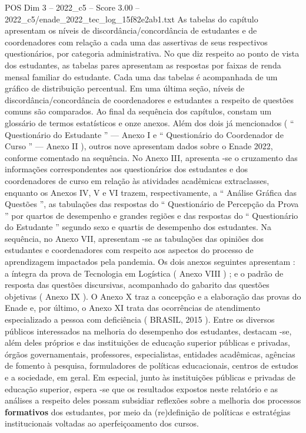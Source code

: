 \begin{textsample}{POS Dim 3 – 2022\_c5 – Score 3.00 – 2022\_c5/enade\_2022\_tec\_log\_15f82e2ab1.txt}
As tabelas do capítulo apresentam os níveis de discordância/concordância de estudantes e de coordenadores com relação a cada uma das assertivas de seus respectivos questionários, por categoria administrativa.
No que diz respeito ao ponto de vista dos estudantes, as tabelas pares apresentam as respostas por faixas de renda mensal familiar do estudante.
Cada uma das tabelas é acompanhada de um gráfico de distribuição percentual.
Em uma última seção, níveis de discordância/concordância de coordenadores e estudantes a respeito de questões comuns são comparados.
Ao final da sequência dos capítulos, constam um glossário de termos estatísticos e onze anexos.
Além dos dois já mencionados ( “ Questionário do Estudante ” — Anexo I e “ Questionário do Coordenador de Curso ” — Anexo II ), outros nove apresentam dados sobre o Enade 2022, conforme comentado na sequência.
No Anexo III, apresenta -se o cruzamento das informações correspondentes aos questionários dos estudantes e dos coordenadores de curso em relação às atividades acadêmicas extraclasses, enquanto os Anexos IV, V e VI trazem, respectivamente, a “ Análise Gráfica das Questões ”, as tabulações das respostas do “ Questionário de Percepção da Prova ” por quartos de desempenho e grandes regiões e das respostas do “ Questionário do Estudante ” segundo sexo e quartis de desempenho dos estudantes.
Na sequência, no Anexo VII, apresentam -se as tabulações das opiniões dos estudantes e coordenadores com respeito aos aspectos do processo de aprendizagem impactados pela pandemia.
Os dois anexos seguintes apresentam : a íntegra da prova de Tecnologia em Logística ( Anexo VIII ) ; e o padrão de resposta das questões discursivas, acompanhado do gabarito das questões objetivas ( Anexo IX ).
O Anexo X traz a concepção e a elaboração das provas do Enade e, por último, o Anexo XI trata das ocorrências de atendimento especializado a pessoa com deficiência ( BRASIL, 2015 ).
Entre os diversos públicos interessados na melhoria do desempenho dos estudantes, destacam -se, além deles próprios e das instituições de educação superior públicas e privadas, órgãos governamentais, professores, especialistas, entidades acadêmicas, agências de fomento à pesquisa, formuladores de políticas educacionais, centros de estudos e a sociedade, em geral.
Em especial, junto às instituições públicas e privadas de educação superior, espera -se que os resultados expostos neste relatório e as análises a respeito deles possam subsidiar reflexões sobre a melhoria dos processos \textbf{formativos} dos estudantes, por meio da (re)definição de políticas e estratégias institucionais voltadas ao aperfeiçoamento dos cursos.

\end{textsample}
